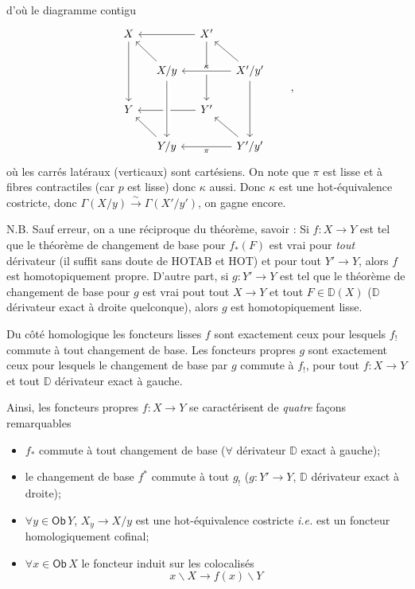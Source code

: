 \documentclass[11pt]{article}
\newcommand{\msp}[1]{\marginpar{\footnotesize [#1]}}
\newcommand{\Ob}{\mathsf{Ob}}
\newcommand{\DD}{\mathbb{D}}
\begin{document}
\noindent\msp{page 58}
d'où le diagramme contigu
\[
\begin{tikzcd}[column sep=small]
X \arrow[dd] & & X' \arrow[ll] \arrow[dd] & \\
& X/y \arrow[ul] & & X'/y' \arrow[ll, crossing over, "\kappa"'] \arrow[ul] \arrow[dd] \\
Y & & Y' \arrow[ll] & \\
& Y/y \arrow[ul] \arrow[from=uu, crossing over] & & Y'/y' \arrow[ll, "\pi"] \arrow[ul]
\end{tikzcd}
\qquad ,
\]
où les carrés latéraux (verticaux) sont cartésiens. On note que $\pi$ est lisse et à fibres contractiles (car $p$ est lisse) donc $\kappa$ aussi. Donc $\kappa$ est une hot-équivalence costricte, donc $\Gamma(X/y) \overset{\sim}{\longrightarrow} \Gamma(X'/y')$, on gagne encore.

\noindent N.B. Sauf erreur, on a une réciproque du théorème, savoir : Si $f : X \to Y$ est tel que le théorème de changement de base pour $f_*(F)$ est vrai pour \textit{tout} dérivateur (il suffit sans doute de \textsf{HOTAB} et \textsf{HOT}) et pour tout $Y' \to Y$, alors $f$ est homotopiquement propre. D'autre part, si $g : Y' \to Y$ est tel que le théorème de changement de base pour $g$ est vrai pout tout $X \to Y$ et tout $F \in \DD(X)$ ($\DD$ dérivateur exact à droite quelconque), alors $g$ est homotopiquement lisse. %

\noindent Du côté homologique les foncteurs lisses $f$ sont exactement ceux pour lesquels $f_!$ commute à tout changement de base. Les foncteurs propres $g$ sont exactement ceux pour lesquels le changement de base par $g$ commute à $f_!$, pour tout $f : X \to Y$ et tout $\DD$ dérivateur exact à gauche.

\noindent\msp{page 59}
Ainsi, les foncteurs propres $f : X \to Y$ se caractérisent de \textit{quatre} façons remarquables
\begin{itemize}[label={}, leftmargin=0pt, itemindent=2\parindent, labelsep=0.3em]
\item[\textit{a})] $f_*$ commute à tout changement de base ($\forall$ dérivateur $\DD$ exact à gauche);
\item[\textit{b})] le changement de base $f^*$ commute à tout $g_!$ ($g : Y' \to Y$, $\DD$ dérivateur exact à droite);
\item[\textit{c})] $\forall y \in \Ob\, Y$, $X_y \to X/y$ est une hot-équivalence costricte \textit{i.e.} est un foncteur homologiquement cofinal;
\item[\textit{d})] $\forall x \in \Ob\, X$ le foncteur induit sur les colocalisés
\[
x\backslash X \longrightarrow f(x)\backslash Y
\]
\end{itemize}
\end{document}
